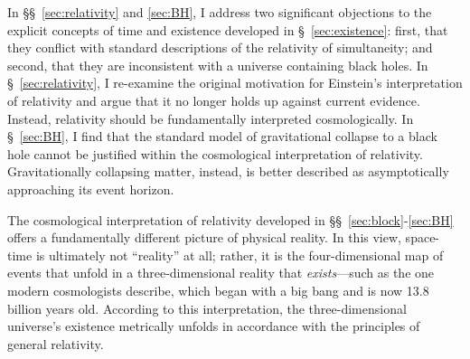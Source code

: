 \documentclass[aps,rmp,groupedaddress,twocolumn,10pt]{revtex4-2}
\begin{document}
In \S\S~\ref{sec:relativity} and \ref{sec:BH}, I address two significant objections to the explicit concepts of time and existence developed in \S~\ref{sec:existence}: first, that they conflict with standard descriptions of the relativity of simultaneity; and second, that they are inconsistent with a universe containing black holes. In \S~\ref{sec:relativity}, I re-examine the original motivation for Einstein's interpretation of relativity and argue that it no longer holds up against current evidence. Instead, relativity should be fundamentally interpreted cosmologically. In \S~\ref{sec:BH}, I find that the standard model of gravitational collapse to a black hole cannot be justified within the cosmological interpretation of relativity. Gravitationally collapsing matter, instead, is better described as asymptotically approaching its event horizon.

The cosmological interpretation of relativity developed in \S\S~\ref{sec:block}-\ref{sec:BH} offers a fundamentally different picture of physical reality. In this view, space-time is ultimately not ``reality'' at all; rather, it is the four-dimensional map of events that unfold in a three-dimensional reality that \textit{exists}---such as the one modern cosmologists describe, which began with a big bang and is now 13.8 billion years old. According to this interpretation, the three-dimensional universe's existence metrically unfolds in accordance with the principles of general relativity. 
\end{document}
